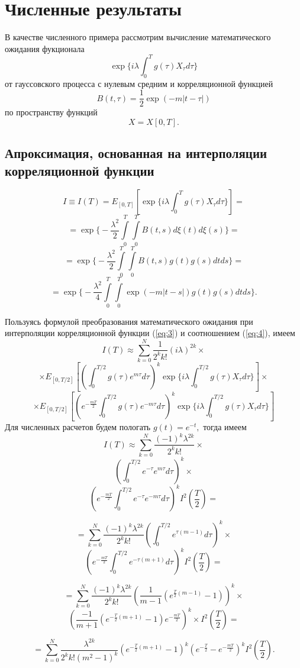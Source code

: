 \documentclass [a4paper, 12pt]{report}
\begin{document}
\chapter{Численные результаты}

В качестве численного примера рассмотрим вычисление математического ожидания фукционала
$$
\exp\{i\lambda\int_{0}^{T}g(\tau)X_\tau d\tau\}
$$
от гауссовского процесса с нулевым средним и корреляционной функцией
$$ B(t,\tau) = \frac{1}{2}\exp(-m|t-\tau|) $$
по пространству функций
$$ X=X[0, T]. $$

\section{Апроксимация, основанная на интерполяции корреляционной
функции}

$$
I\equiv I(T) =
E_{[0,T]}[\exp\{i\lambda\int_{0}^{T}g(\tau)X_\tau d\tau\}] =
$$
$$
= \exp\Big\{-\frac{\lambda^2}{2}\int\limits_0^T\int\limits_0^T
B(t,s)d\xi(t)d\xi(s)\Big\} =
$$
$$
= \exp\Big\{-\frac{\lambda^2}{2}\int\limits_0^T\int\limits_0^T
B(t,s)g(t)g(s)dtds\Big\} =
$$
$$
= \exp\Big\{-\frac{\lambda^2}{4}\int\limits_0^T\int\limits_0^T
\exp(-m|t-s|)g(t)g(s)dtds\Big\}.
$$

Пользуясь формулой преобразования математического ожидания при
интерполяции корреляционной функции (\ref{eq:3}) и
соотношением (\ref{eq:4}), имеем
$$
I(T)\approx \sum_{k=0}^{N}\frac{1}{2^k k!}(i\lambda)^{2k}\times
$$
$$
\times E_{[0,T/2]}[(\int_{0}^{T/2}g(\tau)e^{m\tau}d\tau)^k
\exp\{i\lambda\int_{0}^{T/2}g(\tau)X_\tau d\tau\}]\times
$$
$$
\times E_{[0,T/2]}[(e^{-\frac{mT}{2}}\int_{0}^{T/2}g(\tau)e^{-m\tau}d\tau)^k
\exp\{i\lambda\int_{0}^{T/2}g(\tau)X_\tau d\tau\}]
$$
Для численных расчетов будем пологать $g(t) = e^{-t},$ тогда имеем
$$
I(T)\approx \sum_{k=0}^{N} \frac{(-1)^k\lambda^{2k}} {2^k k!} \times
$$
$$
(\int_{0}^{T/2}e^{-\tau}e^{m\tau}d\tau)^k \times
$$
$$
(e^{-\frac{mT}{2}}\int_{0}^{T/2}e^{-\tau}e^{-m\tau}d\tau)^k
I^2(\frac{T}{2})=
$$

$$
= \sum_{k=0}^{N} \frac{(-1)^k\lambda^{2k}} {2^k k!}
(\int_{0}^{T/2}e^{\tau(m-1)}d\tau)^k \times
$$
$$
(e^{-\frac{mT}{2}}\int_{0}^{T/2}e^{-\tau(m+1)}d\tau)^k
I^2(\frac{T}{2}) =
$$

$$
= \sum_{k=0}^{N} \frac{(-1)^k\lambda^{2k}} {2^k k!}
(\frac{1}{m-1}(e^{\frac{T}{2}(m-1)} - 1))^k \times
$$
$$
(\frac{-1}{m+1}(e^{-\frac{T}{2}(m+1)} - 1) e^{-\frac{mT}{2}})^k
\times I^2(\frac{T}{2}) =
$$

$$
= \sum_{k=0}^{N} \frac{\lambda^{2k}} {2^k k! (m^2 - 1)^k}
(e^{-\frac{T}{2}(m+1)} - 1)^k (e^{-\frac{T}{2}} - e^{-\frac{mT}{2}})^k
I^2(\frac{T}{2}).
$$
\end{document}
